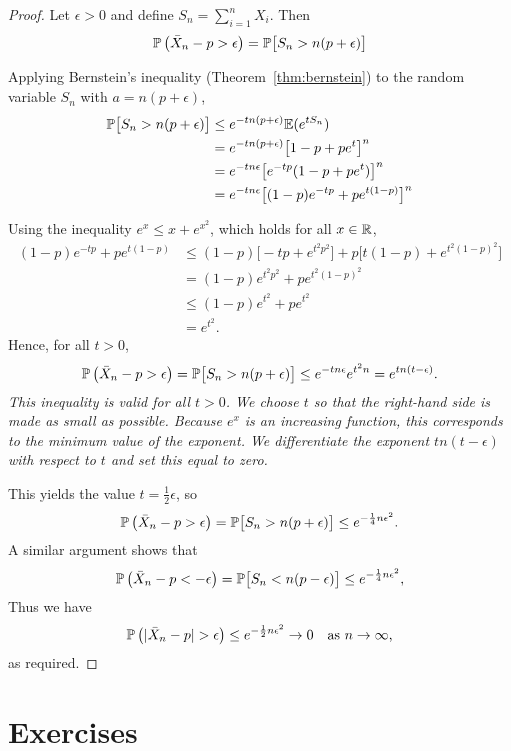 \begin{proof}
Let $\epsilon>0$ and define $S_n=\sum_{i=1}^n X_i$. Then
\[
\mathbb{P}\left(\bar{X}_n - p > \epsilon\right)
	= \mathbb{P}\big[S_n > n(p+\epsilon)\big]
\]


Applying Bernstein's inequality (Theorem~\ref{thm:bernstein}) to the random variable $S_n$ with $a = n(p+\epsilon)$,
\begin{align*}
\mathbb{P}\big[S_n > n(p+\epsilon)\big]
	& \leq e^{-tn(p+\epsilon)}\mathbb{E}(e^{tS_n}) \\
	& = e^{-tn(p+\epsilon)}\big[1-p+pe^t\big]^n \\
	& = e^{-tn\epsilon}\big[ e^{-tp}(1-p+pe^t) \big]^n \\
	& = e^{-tn\epsilon}\big[ (1-p)e^{-tp} + pe^{t(1-p)} \big]^n
\end{align*}

Using the inequality $e^x \leq x + e^{x^2}$, which holds for all $x\in\mathbb{R}$, %
\begin{align*}
(1-p)e^{-tp} + pe^{t(1-p)}  
	& \leq (1-p)\big[-tp + e^{t^2p^2}\big] + p\big[t(1-p) + e^{t^2(1-p)^2}\big] \\
	& = (1-p)e^{t^2p^2} + pe^{t^2(1-p)^2} \\
	& \leq (1-p)e^{t^2} + pe^{t^2} \\
	& = e^{t^2}.
\end{align*}
Hence, for all $t>0$,
\[
\mathbb{P}\left(\bar{X}_n -p > \epsilon\right) = \mathbb{P}\big[S_n > n(p+\epsilon)\big] \leq e^{-tn\epsilon}e^{t^2n} = e^{tn(t-\epsilon)}.
\]
\bit
\it This inequality is valid for all $t>0$. 
\it We choose $t$ so that the right-hand side is made as small as possible. 
\it Because $e^x$ is an increasing function, this corresponds to the minimum value of the exponent. 
\it We differentiate the exponent $tn(t-\epsilon)$ with respect to $t$ and set this equal to zero.
\eit

This yields the value $t = \frac{1}{2}\epsilon$, so
\[
\mathbb{P}\left(\bar{X}_n -p > \epsilon\right) = \mathbb{P}\big[S_n > n(p+\epsilon)\big] \leq e^{-\frac{1}{4}n\epsilon^2}.
\]
A similar argument shows that 
\[
\mathbb{P}\left(\bar{X}_n -p < -\epsilon\right) = \mathbb{P}\big[S_n < n(p-\epsilon)\big] \leq e^{-\frac{1}{4}n\epsilon^2},
\]
Thus we have
\[
\mathbb{P}\left(|\bar{X}_n - p| > \epsilon\right) \leq e^{-\frac{1}{2}n\epsilon^2} \to 0 \text{\quad as $n\to\infty$,}
\]
as required.
\end{proof}




\section{Exercises}


\endinput
